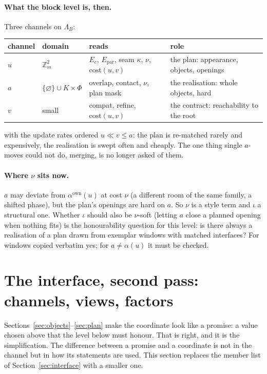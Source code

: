 \documentclass[11pt]{article}
\newcommand{\Z}{\mathbb{Z}}
\newcommand{\1}{\mathds{1}}
\begin{document}
\paragraph{What the block level is, then.} Three channels on $\Lambda_B$:
\begin{center}
\small
\begin{tabular}{@{}llll@{}}
\toprule
channel & domain & reads & role \\
\midrule
$u$ & $\Z_m^2$ & $E_c$, $E_{\mathrm{par}}$, seam $\kappa$, $\nu$, $\mathrm{cost}(u, v)$ & the plan: appearance, objects, openings \\
$a$ & $\{\varnothing\} \cup K \times \Phi$ & overlap, contact, $\nu$, plan mask & the realisation: whole objects, hard \\
$v$ & small & compat, refine, $\mathrm{cost}(u, v)$ & the contract: reachability to the root \\
\bottomrule
\end{tabular}
\end{center}
with the update rates ordered $u \ll v \le a$: the plan is re-matched rarely
and expensively, the realisation is swept often and cheaply. The one thing
single $a$-moves could not do, merging, is no longer asked of them.

\paragraph{Where $\nu$ sits now.} $a$ may deviate from $\alpha^{\mathrm{own}}(u)$ at
cost $\nu$ (a different room of the same family, a shifted phase), but the plan's
openings are hard on $a$. So $\nu$ is a style term and $\iota$ a structural one.
Whether $\iota$ should also be $\nu$-soft (letting $a$ close a planned opening when
nothing fits) is the honourability question for this level: is there always a
realisation of a plan drawn from exemplar windows with matched interfaces? For
windows copied verbatim yes; for $a \ne \alpha(u)$ it must be checked.

\section{The interface, second pass: channels, views, factors}
\label{sec:views}

Sections~\ref{sec:objects}--\ref{sec:plan} make the coordinate look like a
promise: a value chosen above that the level below must honour. That is right,
and it is the simplification. The difference between a promise and a coordinate
is not in the channel but in how its statements are used. This section replaces
the member list of Section~\ref{sec:interface} with a smaller one.
\end{document}
